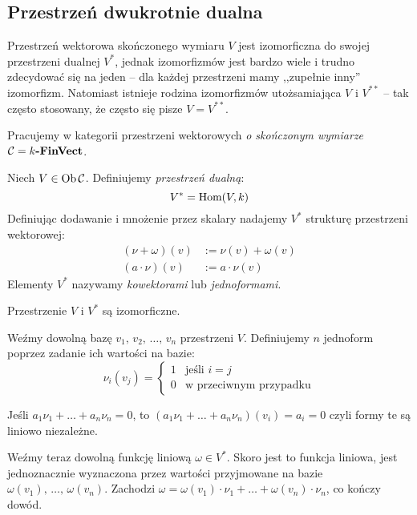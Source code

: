 \subsection{\starred Przestrzeń dwukrotnie dualna}
{
\newcommand{\dual}[1]{{#1}^{*}}
\newcommand{\ddual}[1]{{#1}^{**}}

\begin{idea}
  Przestrzeń wektorowa skończonego wymiaru $V$ jest izomorficzna do swojej przestrzeni dualnej $\dual V$, jednak izomorfizmów jest bardzo wiele i trudno zdecydować się na jeden -- dla każdej przestrzeni mamy ,,zupełnie inny'' izomorfizm. Natomiast istnieje rodzina izomorfizmów utożsamiająca $V$ i $\ddual V$ -- tak często stosowany, że często się pisze $V=\ddual V$.
\end{idea}

\begin{nott}
  Pracujemy w kategorii przestrzeni wektorowych \emph{o skończonym wymiarze} $\mathcal C=k\textbf{-FinVect}$.
\end{nott}

\begin{defn}
  Niech $V\in \textrm{Ob\,}{\mathcal C}$. Definiujemy \emph{przestrzeń dualną}:
    $$\dual V = \Mor Vk$$
  Definiując dodawanie i mnożenie przez skalary nadajemy $\dual V$ strukturę przestrzeni wektorowej:
  \begin{align*}
    (\nu+\omega)(v) &:= \nu(v) + \omega(v)\\
    (a\cdot \nu)(v) &:= a\cdot \nu(v)
  \end{align*}
  Elementy $\dual V$ nazywamy \emph{kowektorami} lub \emph{jednoformami}.
\end{defn}

\begin{thm}
  Przestrzenie $V$ i $\dual V$ są izomorficzne.
\end{thm}

\begin{prof}
  Weźmy dowolną bazę $v_1,\, v_2,\, \dots,\, v_n$ przestrzeni $V$. Definiujemy $n$ jednoform poprzez zadanie ich wartości na bazie:
  $$\nu_i(v_j) = \begin{cases} 1 & \text{jeśli } i=j\\ 0 & \text{w przeciwnym przypadku}\end{cases}$$

  Jeśli $a_1\nu_1+\dots + a_n\nu_n=0$, to $(a_1\nu_1+\dots + a_n\nu_n)(v_i)=a_i=0$ czyli formy te są liniowo niezależne.

  Weźmy teraz dowolną funkcję liniową $\omega\in \dual V$. Skoro jest to funkcja liniowa, jest jednoznacznie wyznaczona przez wartości przyjmowane na bazie $\omega(v_1),\,\dots,\,\omega(v_n)$. Zachodzi $\omega = \omega(v_1)\cdot \nu_1+\dots+\omega(v_n)\cdot \nu_n$, co kończy dowód.
\end{prof}

}
